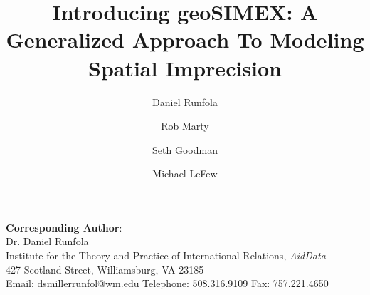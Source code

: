 


\author[1]{Daniel Runfola}
\author[1]{Rob Marty}
\author[1]{Seth Goodman}
\author[1]{Michael LeFew}
\renewcommand\Authands{ and }

\title{Introducing geoSIMEX: A Generalized Approach To Modeling Spatial Imprecision}



\usepackage{Sweave}




\maketitle 
\begin{flushleft}
\textbf{Corresponding Author}:\\
Dr. Daniel Runfola\\
Institute for the Theory and Practice of International Relations, \emph{AidData}\\
427 Scotland Street, Williamsburg, VA 23185\\
Email: dsmillerrunfol@wm.edu
Telephone: 508.316.9109
Fax: 757.221.4650
\end{flushleft}


\newpage

\doublespacing

